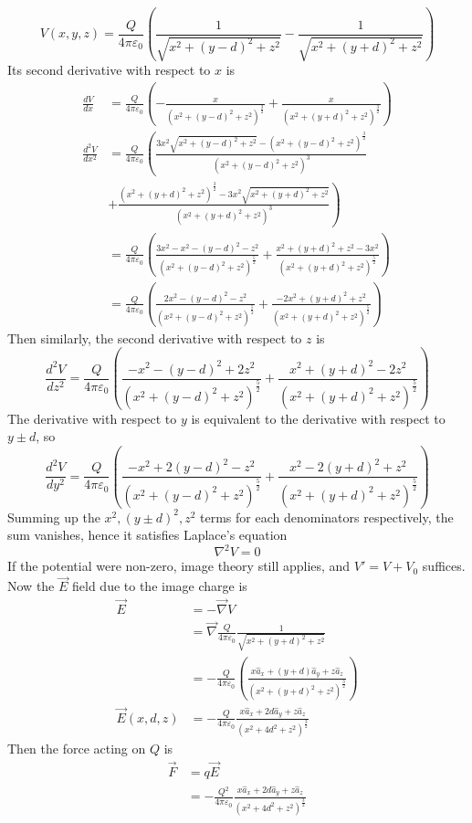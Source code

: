 \documentclass[answers]{exam}
\begin{document}
\begin{questions}
\begin{solution}
    $$V(x,y,z) = \frac{Q}{4\pi\varepsilon_0}\left(\frac{1}{\sqrt{x^2+(y-d)^2+z^2}} - \frac{1}{\sqrt{x^2+(y+d)^2+z^2}}\right)$$
    Its second derivative with respect to $x$ is
    \begin{align*}
        \frac{dV}{dx} &= \frac{Q}{4\pi\varepsilon_0} \left(-\frac{x}{(x^2+(y-d)^2+z^2)^{\frac{3}{2}}} + \frac{x}{(x^2+(y+d)^2+z^2)^{\frac{3}{2}}}\right) \\
        \frac{d^2V}{dx^2} &= \frac{Q}{4\pi\varepsilon_0} \left(\frac{3x^2\sqrt{x^2+(y-d)^2+z^2} - (x^2+(y-d)^2+z^2)^{\frac{3}{2}}}{(x^2+(y-d)^2+z^2)^3}\right. \\
                          &+ \left.\frac{(x^2+(y+d)^2+z^2)^{\frac{3}{2}} - 3x^2\sqrt{x^2+(y+d)^2+z^2}}{(x^2+(y+d)^2+z^2)^3}\right) \\
                          &= \frac{Q}{4\pi\varepsilon_0} \left(\frac{3x^2 - x^2 - (y-d)^2 - z^2}{(x^2+(y-d)^2+z^2)^{\frac{5}{2}}} + \frac{x^2+(y+d)^2+z^2 - 3x^2}{(x^2+(y+d)^2+z^2)^{\frac{5}{2}}}\right) \\
                          &= \frac{Q}{4\pi\varepsilon_0} \left(\frac{2x^2 - (y-d)^2 - z^2}{(x^2+(y-d)^2+z^2)^{\frac{5}{2}}} + \frac{-2x^2+(y+d)^2+z^2}{(x^2+(y+d)^2+z^2)^{\frac{5}{2}}}\right)
    \end{align*}
    Then similarly, the second derivative with respect to $z$ is
    $$\frac{d^2V}{dz^2} = \frac{Q}{4\pi\varepsilon_0} \left(\frac{-x^2 - (y-d)^2 + 2z^2}{(x^2+(y-d)^2+z^2)^{\frac{5}{2}}} + \frac{x^2+(y+d)^2-2z^2}{(x^2+(y+d)^2+z^2)^{\frac{5}{2}}}\right)$$
    The derivative with respect to $y$ is equivalent to the derivative with respect to $y\pm d$, so
    $$\frac{d^2V}{dy^2} = \frac{Q}{4\pi\varepsilon_0} \left(\frac{-x^2 + 2(y-d)^2 - z^2}{(x^2+(y-d)^2+z^2)^{\frac{5}{2}}} + \frac{x^2-2(y+d)^2+z^2}{(x^2+(y+d)^2+z^2)^{\frac{5}{2}}}\right)$$
    Summing up the $x^2,(y\pm d)^2,z^2$ terms for each denominators respectively, the sum vanishes, hence it satisfies Laplace's equation
    $$\nabla^2V = 0$$
    If the potential were non-zero, image theory still applies, and $V' = V + V_0$ suffices. Now the $\vec E$ field due to the image charge is
    \begin{align*}
        \vec E &= -\vec\nabla V \\
               &= \vec\nabla \frac{Q}{4\pi\varepsilon_0} \frac{1}{\sqrt{x^2+(y+d)^2+z^2}} \\
               &= -\frac{Q}{4\pi\varepsilon_0} \left(\frac{x\hat a_x + (y+d)\hat a_y + z\hat a_z}{(x^2+(y+d)^2+z^2)^{\frac{3}{2}}}\right) \\
        \vec E(x,d,z) &= -\frac{Q}{4\pi\varepsilon_0} \frac{x\hat a_x + 2d\hat a_y + z\hat a_z}{(x^2+4d^2+z^2)^{\frac{3}{2}}}
    \end{align*}
    Then the force acting on $Q$ is
    \begin{align*}
        \vec F &= q\vec E \\
               &= -\frac{Q^2}{4\pi\varepsilon_0} \frac{x\hat a_x + 2d\hat a_y + z\hat a_z}{(x^2+4d^2+z^2)^{\frac{3}{2}}} \\
    \end{align*}
\end{solution}


\end{questions}
\end{document}

